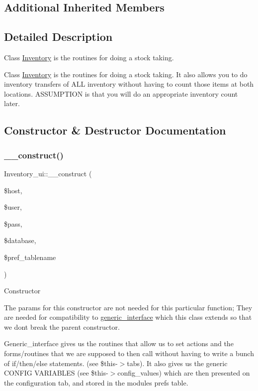 \subsection*{Additional Inherited Members}


\subsection{Detailed Description}
Class \hyperlink{class_inventory}{Inventory} is the routines for doing a stock taking.

Class \hyperlink{class_inventory}{Inventory} is the routines for doing a stock taking. It also allows you to do inventory transfers of A\+LL inventory without having to count those items at both locations. A\+S\+S\+U\+M\+P\+T\+I\+ON is that you will do an appropriate inventory count later. 

\subsection{Constructor \& Destructor Documentation}
\hypertarget{class_inventory__ui_a903fc6b7eb51afa2c4f6c1392783973d}{}\label{class_inventory__ui_a903fc6b7eb51afa2c4f6c1392783973d} 
\subsubsection{\texorpdfstring{\+\_\+\+\_\+construct()}{\_\_construct()}}
{\footnotesize\ttfamily Inventory\+\_\+ui\+::\+\_\+\+\_\+construct (\begin{DoxyParamCaption}\item[{}]{\$host,  }\item[{}]{\$user,  }\item[{}]{\$pass,  }\item[{}]{\$database,  }\item[{}]{\$pref\+\_\+tablename }\end{DoxyParamCaption})}

Constructor

The params for this constructor are not needed for this particular function; They are needed for compatibility to \hyperlink{classgeneric__interface}{generic\+\_\+interface} which this class extends so that we don\textquotesingle{}t break the parent constructor.

Generic\+\_\+interface gives us the routines that allow us to set actions and the forms/routines that we are supposed to then call without having to write a bunch of if/then/else statements. (see \$this-\/$>$tabs). It also gives us the generic C\+O\+N\+F\+IG V\+A\+R\+I\+A\+B\+L\+ES (see \$this-\/$>$config\+\_\+values) which are then presented on the configuration tab, and stored in the modules prefs table.


